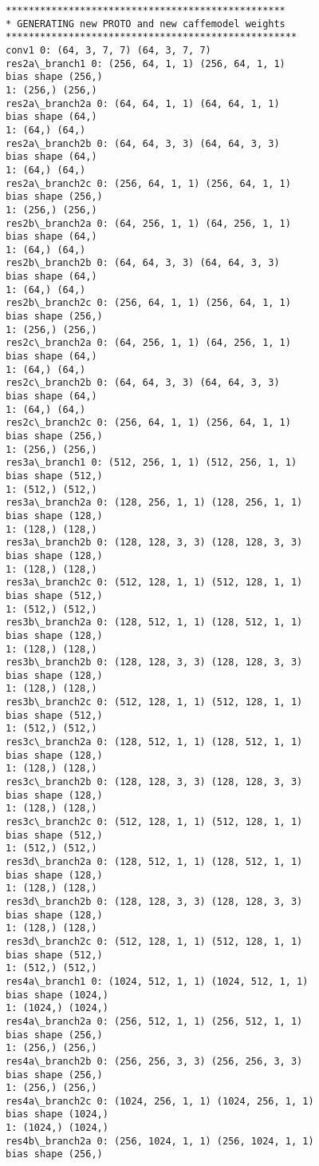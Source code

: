 \documentclass[11pt]{article}
\begin{document}
\begin{Verbatim}[commandchars=\\\{\}]
*************************************************
* GENERATING new PROTO and new caffemodel weights  
***************************************************
conv1 0: (64, 3, 7, 7) (64, 3, 7, 7)
res2a\_branch1 0: (256, 64, 1, 1) (256, 64, 1, 1)
bias shape (256,)
1: (256,) (256,)
res2a\_branch2a 0: (64, 64, 1, 1) (64, 64, 1, 1)
bias shape (64,)
1: (64,) (64,)
res2a\_branch2b 0: (64, 64, 3, 3) (64, 64, 3, 3)
bias shape (64,)
1: (64,) (64,)
res2a\_branch2c 0: (256, 64, 1, 1) (256, 64, 1, 1)
bias shape (256,)
1: (256,) (256,)
res2b\_branch2a 0: (64, 256, 1, 1) (64, 256, 1, 1)
bias shape (64,)
1: (64,) (64,)
res2b\_branch2b 0: (64, 64, 3, 3) (64, 64, 3, 3)
bias shape (64,)
1: (64,) (64,)
res2b\_branch2c 0: (256, 64, 1, 1) (256, 64, 1, 1)
bias shape (256,)
1: (256,) (256,)
res2c\_branch2a 0: (64, 256, 1, 1) (64, 256, 1, 1)
bias shape (64,)
1: (64,) (64,)
res2c\_branch2b 0: (64, 64, 3, 3) (64, 64, 3, 3)
bias shape (64,)
1: (64,) (64,)
res2c\_branch2c 0: (256, 64, 1, 1) (256, 64, 1, 1)
bias shape (256,)
1: (256,) (256,)
res3a\_branch1 0: (512, 256, 1, 1) (512, 256, 1, 1)
bias shape (512,)
1: (512,) (512,)
res3a\_branch2a 0: (128, 256, 1, 1) (128, 256, 1, 1)
bias shape (128,)
1: (128,) (128,)
res3a\_branch2b 0: (128, 128, 3, 3) (128, 128, 3, 3)
bias shape (128,)
1: (128,) (128,)
res3a\_branch2c 0: (512, 128, 1, 1) (512, 128, 1, 1)
bias shape (512,)
1: (512,) (512,)
res3b\_branch2a 0: (128, 512, 1, 1) (128, 512, 1, 1)
bias shape (128,)
1: (128,) (128,)
res3b\_branch2b 0: (128, 128, 3, 3) (128, 128, 3, 3)
bias shape (128,)
1: (128,) (128,)
res3b\_branch2c 0: (512, 128, 1, 1) (512, 128, 1, 1)
bias shape (512,)
1: (512,) (512,)
res3c\_branch2a 0: (128, 512, 1, 1) (128, 512, 1, 1)
bias shape (128,)
1: (128,) (128,)
res3c\_branch2b 0: (128, 128, 3, 3) (128, 128, 3, 3)
bias shape (128,)
1: (128,) (128,)
res3c\_branch2c 0: (512, 128, 1, 1) (512, 128, 1, 1)
bias shape (512,)
1: (512,) (512,)
res3d\_branch2a 0: (128, 512, 1, 1) (128, 512, 1, 1)
bias shape (128,)
1: (128,) (128,)
res3d\_branch2b 0: (128, 128, 3, 3) (128, 128, 3, 3)
bias shape (128,)
1: (128,) (128,)
res3d\_branch2c 0: (512, 128, 1, 1) (512, 128, 1, 1)
bias shape (512,)
1: (512,) (512,)
res4a\_branch1 0: (1024, 512, 1, 1) (1024, 512, 1, 1)
bias shape (1024,)
1: (1024,) (1024,)
res4a\_branch2a 0: (256, 512, 1, 1) (256, 512, 1, 1)
bias shape (256,)
1: (256,) (256,)
res4a\_branch2b 0: (256, 256, 3, 3) (256, 256, 3, 3)
bias shape (256,)
1: (256,) (256,)
res4a\_branch2c 0: (1024, 256, 1, 1) (1024, 256, 1, 1)
bias shape (1024,)
1: (1024,) (1024,)
res4b\_branch2a 0: (256, 1024, 1, 1) (256, 1024, 1, 1)
bias shape (256,)

\end{Verbatim}
\end{document}
